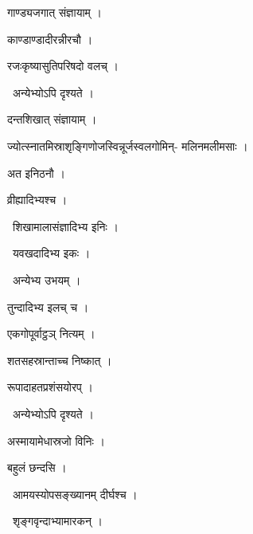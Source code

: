 \documentclass[10pt, openany, oneside]{book}
\begin{document}
\noindent गाण्ड्यजगात् संज्ञायाम् ।

\noindent काण्डाण्डादीरन्नीरचौ ।

\noindent रजःकृष्यासुतिपरिषदो वलच् ।

\par\noindent\hspace{1.5em}{\vps वा॰}~{\qt अन्येभ्योऽपि दृश्यते ।}

\noindent दन्तशिखात् संज्ञायाम् ।

\noindent ज्योत्स्नातमिस्राश‍ृङ्गिणोजस्विन्नूर्जस्वलगोमिन्- मलिनमलीमसाः ।

\noindent अत इनिठनौ ।

\noindent व्रीह्यादिभ्यश्च ।

\par\noindent\hspace{1.5em}{\vps वा॰}~{\qt शिखामालासंज्ञादिभ्य इनिः ।}

\par\noindent\hspace{1.5em}{\vps वा॰}~{\qt यवखदादिभ्य इकः ।}

\par\noindent\hspace{1.5em}{\vps वा॰}~{\qt अन्येभ्य उभयम् ।}

\noindent तुन्दादिभ्य इलच् च ।

\noindent एकगोपूर्वाट्ठञ् नित्यम् ।

\noindent शतसहस्रान्ताच्च निष्कात् ।

\noindent रूपादाहतप्रशंसयोरप् ।

\par\noindent\hspace{1.5em}{\vps वा॰}~{\qt अन्येभ्योऽपि दृश्यते ।}

\noindent अस्मायामेधास्रजो विनिः ।

\noindent बहुलं छन्दसि ।

\par\noindent\hspace{1.5em}{\vps वा॰}~{\qt आमयस्योपसङ्ख्यानम् दीर्घश्च ।}

\par\noindent\hspace{1.5em}{\vps वा॰}~{\qt शृङ्गवृन्दाभ्यामारकन् ।}
\end{document}
